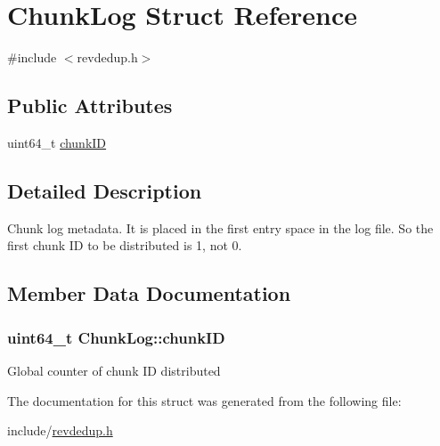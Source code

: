 \hypertarget{structChunkLog}{\section{\-Chunk\-Log \-Struct \-Reference}
\label{structChunkLog}
}


{\ttfamily \#include $<$revdedup.\-h$>$}

\subsection*{\-Public \-Attributes}
\begin{DoxyCompactItemize}
\item 
uint64\-\_\-t \hyperlink{structChunkLog_a616ced22ecd39d04d6d4fec80ca88f01}{chunk\-I\-D}
\end{DoxyCompactItemize}


\subsection{\-Detailed \-Description}
\-Chunk log metadata. \-It is placed in the first entry space in the log file. \-So the first chunk \-I\-D to be distributed is 1, not 0. 

\subsection{\-Member \-Data \-Documentation}
\hypertarget{structChunkLog_a616ced22ecd39d04d6d4fec80ca88f01}{
\subsubsection[{chunk\-I\-D}]{\setlength{\rightskip}{0pt plus 5cm}uint64\-\_\-t {\bf \-Chunk\-Log\-::chunk\-I\-D}}}\label{structChunkLog_a616ced22ecd39d04d6d4fec80ca88f01}
\-Global counter of chunk \-I\-D distributed 

\-The documentation for this struct was generated from the following file\-:\begin{DoxyCompactItemize}
\item 
include/\hyperlink{revdedup_8h}{revdedup.\-h}\end{DoxyCompactItemize}
